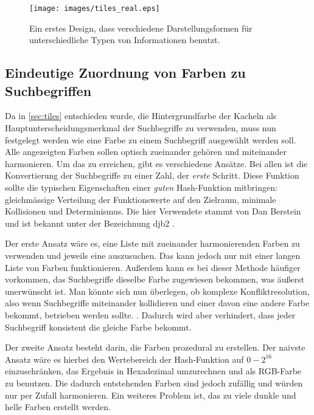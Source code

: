 \documentclass[12pt,twoside]{book}
\begin{document}
\begin{figure}[htbp]
    \centering
    \texttt{[image: images/tiles\_real.eps]}
    \caption{Ein erstes Design, dass verschiedene Darstellungsformen für unterschiedliche Typen von Informationen benutzt.}
    \label{fig:awesome_image}
\end{figure}

\subsection{Eindeutige Zuordnung von Farben zu Suchbegriffen}

Da in \ref{sec:tiles} entschieden wurde, die Hintergrundfarbe der Kacheln als Hauptunterscheidungsmerkmal der Suchbegriffe zu verwenden, muss nun festgelegt werden wie eine Farbe zu einem Suchbegriff ausgewählt werden soll.
Alle angezeigten Farben sollen optisch zueinander gehören und miteinander harmonieren. Um das zu erreichen, gibt es verschiedene Ansätze. Bei allen ist die Konvertierung der Suchbegriffe zu einer Zahl, der \textit{erste} Schritt. Diese Funktion sollte die typischen Eigenschaften einer \textit{guten} Hash-Funktion mitbringen: gleichmässige Verteilung der Funktionswerte auf den Zielraum, minimale Kollisionen und Determinismus.
Die hier Verwendete stammt von Dan Berstein und ist bekannt unter der Bezeichnung djb2 \cite{djb2}.

Der erste Ansatz wäre es, eine Liste mit zueinander harmonierenden Farben zu verwenden und jeweils eine auszusuchen. Das kann jedoch nur mit einer langen Liste von Farben funktionieren. Außerdem kann es bei dieser Methode häufiger vorkommen, das Suchbegriffe dieselbe Farbe zugewiesen bekommen, was äußerst unerwünscht ist. Man könnte sich nun überlegen, ob komplexe Konfliktresolution, also wenn Suchbegriffe miteinander kollidieren und einer davon eine andere Farbe bekommt, betrieben werden sollte. .
Dadurch wird aber verhindert, dass jeder Suchbegriff konsistent die gleiche Farbe bekommt.


Der zweite Ansatz besteht darin, die Farben prozedural zu erstellen.
Der naivste Ansatz wäre es hierbei den Wertebereich der Hash-Funktion auf $0 - 2^{16}$ einzuschränken, das Ergebnis in Hexadezimal umzurechnen und als RGB-Farbe zu benutzen. Die dadurch entstehenden Farben sind jedoch zufällig und würden nur per Zufall harmonieren. Ein weiteres Problem ist, das zu viele dunkle und helle Farben erstellt werden.
\end{document}
